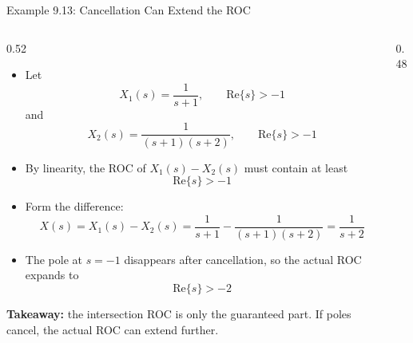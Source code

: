 \begin{frame}[t]{Example 9.13: Cancellation Can Extend the ROC}
  \small
  \begin{columns}[T]
    \begin{column}{0.52\textwidth}
    \begin{itemize}\setlength{\itemsep}{0.2em}
        \item Let
          \[
            X_1(s)=\frac{1}{s+1},
            \qquad \text{Re}\{s\}>-1
          \]
          and
          \[
            X_2(s)=\frac{1}{(s+1)(s+2)},
            \qquad \text{Re}\{s\}>-1
          \]
        \item By linearity, the ROC of $X_1(s)-X_2(s)$ must contain at least
          \[
            \text{Re}\{s\}>-1
          \]
        \item Form the difference:
          \[
            X(s)=X_1(s)-X_2(s)
            =\frac{1}{s+1}-\frac{1}{(s+1)(s+2)}
            =\frac{1}{s+2}
          \]
        \item The pole at $s=-1$ disappears after cancellation, so the actual ROC expands to
          \[
            \text{Re}\{s\}>-2
          \]
      \end{itemize}
      \textbf{Takeaway:} the intersection ROC is only the guaranteed part.
      If poles cancel, the actual ROC can extend further.
    \end{column}
    \begin{column}{0.48\textwidth}
      \begin{center}


\end{center}
\end{column}
\end{columns}
\end{frame}
